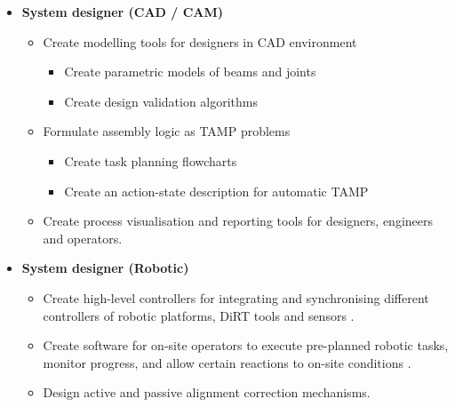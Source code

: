 \begin{itemize}
	\item \textbf{System designer (CAD / CAM)}

	\begin{itemize}
		\item Create modelling tools for designers in CAD environment 
		\begin{itemize}

			\item Create parametric models of beams and joints 

			\item Create design validation algorithms 

		\end{itemize}
		\item Formulate assembly logic as TAMP problems

		\begin{itemize}
			\item Create task planning flowcharts 
			\item Create an action-state description for automatic TAMP 

		\end{itemize}
		\item Create process visualisation and reporting tools for designers, engineers and operators. 

	\end{itemize}
	\item \textbf{System designer (Robotic)}

	\begin{itemize}
		\item Create high-level controllers for integrating and synchronising different controllers of robotic platforms, DiRT tools and sensors .

		\item Create software for on-site operators to execute pre-planned robotic tasks, monitor progress, and allow certain reactions to on-site conditions .

		\item Design active and passive alignment correction mechanisms. 


\end{itemize}
\end{itemize}
